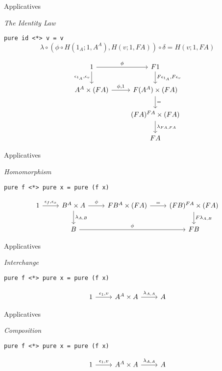 \documentclass[10pt]{beamer}
\newcommand{\Com}[3]{#3^{#2}}
\theoremstyle{definition}
\theoremstyle{remark}
\numberwithin{equation}{section}
\begin{document}
\begin{frame}[fragile]{Applicatives}

  \emph{The Identity Law}

  \lstinline{pure id <*> v = v}
  \[
  \lambda \circ (\phi \circ H(1_A;1,A^A),H(v;1,F A)) \circ \delta = H(v;1,F A)
  \]

  \[
  \begin{tikzcd}
    1 \arrow{r}{\phi}\arrow{d}[swap]{\epsilon_{1_A},\epsilon_v} & F 1 \arrow{d}{F \epsilon_{1_A},F \epsilon_v} \\
    \Com{C}{A}{A}\times (F A) \arrow{r}{\phi,1} & F (\Com{C}{A}{A}) \times (F A) \arrow{d}{=} \\
    & \Com{C}{F A}{(F A)} \times (F A) \arrow{d}{\lambda_{FA,FA}} \\
    & F A
  \end{tikzcd}
  \]

\end{frame}

\begin{frame}[fragile]{Applicatives}

  \emph{Homomorphism}

  \lstinline{pure f <*> pure x = pure (f x)}

  \[
  \begin{tikzcd}
    1 \arrow{r}{\epsilon_f,\epsilon_x} & \Com{C}{A}{B}\times A \arrow{r}{\phi}\arrow{d}{\lambda_{A,B}} &
    F \Com{C}{A}{B} \times (F A) \arrow{r}{=} & \Com{C}{F A}{(F B)} \times (F A) \arrow{d}{F \lambda_{A,B}} \\
    & B \arrow{rr}{\phi} & & F B
  \end{tikzcd}
  \]

\end{frame}

\begin{frame}[fragile]{Applicatives}

  \emph{Interchange}

  \lstinline{pure f <*> pure x = pure (f x)}

  \[
  \begin{tikzcd}
    1 \arrow{r}{\epsilon_1,v} & \Com{C}{A}{A}\times A \arrow{r}{\lambda_{A,A}} & A
  \end{tikzcd}
  \]

\end{frame}

\begin{frame}[fragile]{Applicatives}

  \emph{Composition}

  \lstinline{pure f <*> pure x = pure (f x)}

  \[
  \begin{tikzcd}
    1 \arrow{r}{\epsilon_1,v} & \Com{C}{A}{A}\times A \arrow{r}{\lambda_{A,A}} & A
  \end{tikzcd}
  \]


\end{frame}
\end{document}
